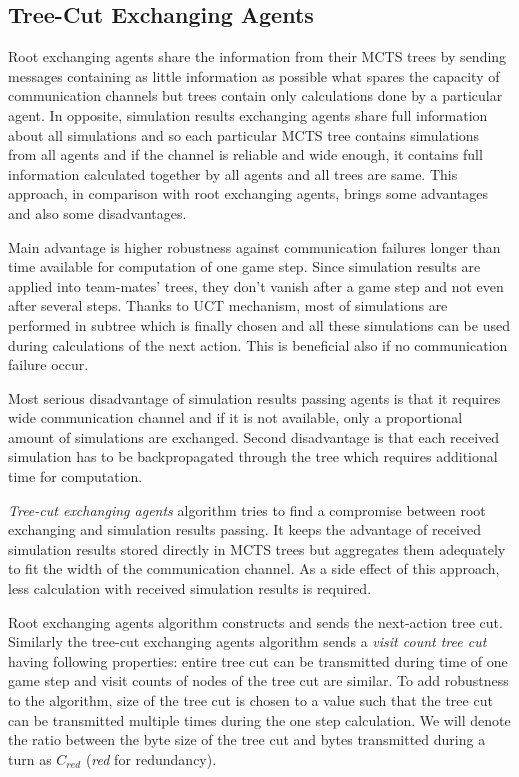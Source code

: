 \subsection{Tree-Cut Exchanging Agents}

Root exchanging agents share the information from their MCTS trees by sending messages
containing as little information as possible what spares the capacity of communication
channels but trees contain only calculations done by a particular agent. In opposite,
simulation results exchanging agents share full information about all simulations and so
each particular MCTS tree contains simulations from all agents and if the channel is reliable
and wide enough, it contains full information calculated together by all agents and all
trees are same. This approach, in comparison with root exchanging agents, brings some
advantages and also some disadvantages. 

Main advantage is higher robustness against
communication failures longer than time available for computation of one game step. Since
simulation results are applied into team-mates' trees, they don't vanish after a game step and
not even after several steps. Thanks to UCT mechanism, most of simulations are performed in
subtree which is finally chosen and all these simulations can be used during calculations of
the next action. This is beneficial also if no communication failure occur.

Most serious disadvantage of simulation results passing agents is that it requires wide
communication channel and if it is not available, only a proportional amount of simulations are
exchanged. Second disadvantage is that each received simulation has to be backpropagated
through the tree which requires additional time for computation.

\emph{Tree-cut exchanging agents} algorithm tries to find a compromise between root exchanging 
and simulation results passing. It keeps the advantage of received simulation results stored
directly in MCTS trees but aggregates them adequately to fit the width of the communication
channel. As a side effect of this approach, less calculation with received simulation results
is required.


Root exchanging agents algorithm constructs and sends the next-action tree cut. Similarly the
tree-cut exchanging agents algorithm sends a \emph{visit count tree cut} having following
properties: entire tree cut can be transmitted during time of one game step and visit counts of
nodes of the tree cut are similar. To add robustness to the algorithm, size of the tree cut is
chosen to a value such that the tree cut can be transmitted multiple times during the
one step calculation. We will denote the ratio between the byte size of the tree cut and bytes
transmitted during a turn as $C_{red}$ (\emph{red} for redundancy).

